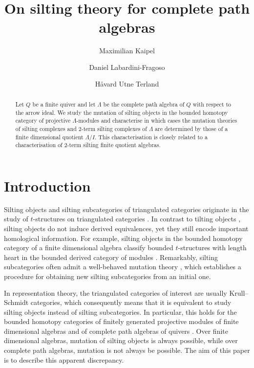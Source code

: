 \documentclass[11pt]{amsart}
\title{On silting theory for complete path algebras}
\author[M. Kaipel]{Maximilian Kaipel}
\author[D. Labardini-Fragoso]{Daniel Labardini-Fragoso}
\author[H. U. Terland]{Håvard Utne Terland}
\theoremstyle{definition}
\begin{document}
\begin{abstract}
	Let $Q$ be a finite quiver and let $\Lambda$ be the complete path algebra of $Q$ with respect to the arrow ideal. We study the mutation of silting objects in the bounded homotopy category of projective $\Lambda$-modules and characterise in which cases the mutation theories of silting complexes and 2-term silting complexes of $\Lambda$ are determined by those of a finite dimensional quotient $\Lambda/I$. This characterisation is closely related to a characterisation of 2-term silting finite quotient algebras. 
\end{abstract}

\maketitle

\section{Introduction}

Silting objects and silting subcategories of triangulated categories originate in the study of $t$-structures on triangulated categories \cite{KV88}. In contrast to tilting objects \cite{Rickard1989}, silting objects do not induce derived equivalences, yet they still encode important homological information. For example, silting objects in the bounded homotopy category of a finite dimensional algebra classify bounded $t$-structures with length heart in the bounded derived category of modules \cite{KY14}. Remarkably, silting subcategories often admit a well-behaved mutation theory \cite{Aihara_2012}, which establishes a procedure for obtaining new silting subcategories from an initial one. 

In representation theory, the triangulated categories of interest are usually Krull--Schmidt categories, which consequently means that it is equivalent to study silting objects instead of silting subcategories. In particular, this holds for the bounded homotopy categories of finitely generated projective modules of finite dimensional algebras and of complete path algebras of quivers \cite{KellerYang2011}. Over finite dimensional algebras, mutation of silting objects is always possible, while over complete path algebras, mutation is not always be possible. The aim of this paper is to describe this apparent discrepancy.
\end{document}
